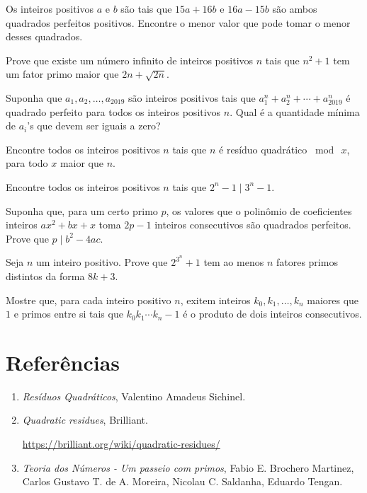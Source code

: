 \documentclass[10pt,a4paper]{article}
\newcommand{\tmod}[1]{\bmod{\ #1}}
\begin{document}
	\begin{prob}[IMO]
		Os inteiros positivos $a$ e $b$ são tais que $15a + 16b$ e $16a - 15b$ são ambos quadrados perfeitos positivos. Encontre o menor valor que pode tomar o menor desses quadrados.
	\end{prob}
	\begin{prob}[IMO]
		Prove que existe um número infinito de inteiros positivos $n$ tais que $n^2 + 1$ tem um fator primo maior que $2n + \sqrt{2n}$.
	\end{prob}
	\begin{prob}
		Suponha que $a_1, a_2, \dots, a_{2019}$ são inteiros positivos tais que $a_1^n + a_2^n + \cdots + a_{2019}^n$ é quadrado perfeito para todos os inteiros positivos $n$. Qual é a quantidade mínima de $a_i$'s que devem ser iguais a zero?
	\end{prob}
	\begin{prob}
		Encontre todos os inteiros positivos $n$ tais que $n$ é resíduo quadrático $\tmod{x}$, para todo $x$ maior que $n$.
	\end{prob}
	\begin{prob}
		Encontre todos os inteiros positivos $n$ tais que $2^n - 1 \mid 3^n - 1$.
	\end{prob}
	\begin{prob}
		Suponha que, para um certo primo $p$, os valores que o polinômio de coeficientes inteiros $ax^2 + bx + x$ toma $2p-1$ inteiros consecutivos são quadrados perfeitos. Prove que $p \mid b^2 - 4ac$.
	\end{prob}
	\begin{prob}
		Seja $n$ um inteiro positivo. Prove que $2^{3^n} + 1$ tem ao menos $n$ fatores primos distintos da forma $8k + 3$.
	\end{prob}
	\begin{prob}
		Mostre que, para cada inteiro positivo $n$, exitem inteiros $k_0, k_1, \dots, k_n$ maiores que $1$ e primos entre si tais que $k_0k_1\cdots k_n - 1$ é o produto de dois inteiros consecutivos.
	\end{prob}


	\newpage
	\section*{Referências}
	\begin{enumerate}
		\item \textit{Resíduos Quadráticos}, Valentino Amadeus Sichinel.
		\item \textit{Quadratic residues}, Brilliant. \par \url{https://brilliant.org/wiki/quadratic-residues/}
		\item \textit{Teoria dos Números - Um passeio com primos}, Fabio E. Brochero Martinez, Carlos Gustavo T. de A. Moreira, Nicolau C. Saldanha, Eduardo Tengan.
	\end{enumerate}
\end{document}
